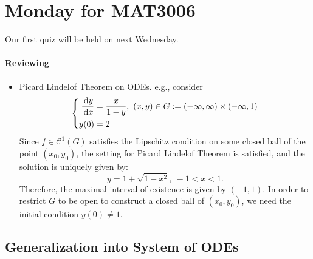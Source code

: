\section{Monday for MAT3006}
Our first quiz will be held on next Wednesday.
\paragraph{Reviewing}
\begin{itemize}
\item
Picard Lindelof Theorem on ODEs. e.g., consider
\[
\left\{
\begin{aligned}
\frac{\,\mathrm{d} y}{\,\mathrm{d} x} &= \frac{x}{1-y},\ (x,y)\in G:=(-\infty,\infty)\times(-\infty,1)\\
y(0)&=2
\end{aligned}
\right.
\]
Since $f\in\mathcal{C}^1(G)$ satisfies the Lipschitz condition on some closed ball of the point $(x_0,y_0)$, the setting for Picard Lindelof Theorem is satisfied, and the solution is uniquely given by:
\[
y = 1+\sqrt{1-x^2},\ -1<x<1.
\]
Therefore, the maximal interval of existence is given by $(-1,1)$. 
In order to restrict $G$ to be open to construct a closed ball of $(x_0,y_0)$, 
we need the initial condition $y(0)\ne1$.
\end{itemize}

\subsection{Generalization into System of ODEs}
